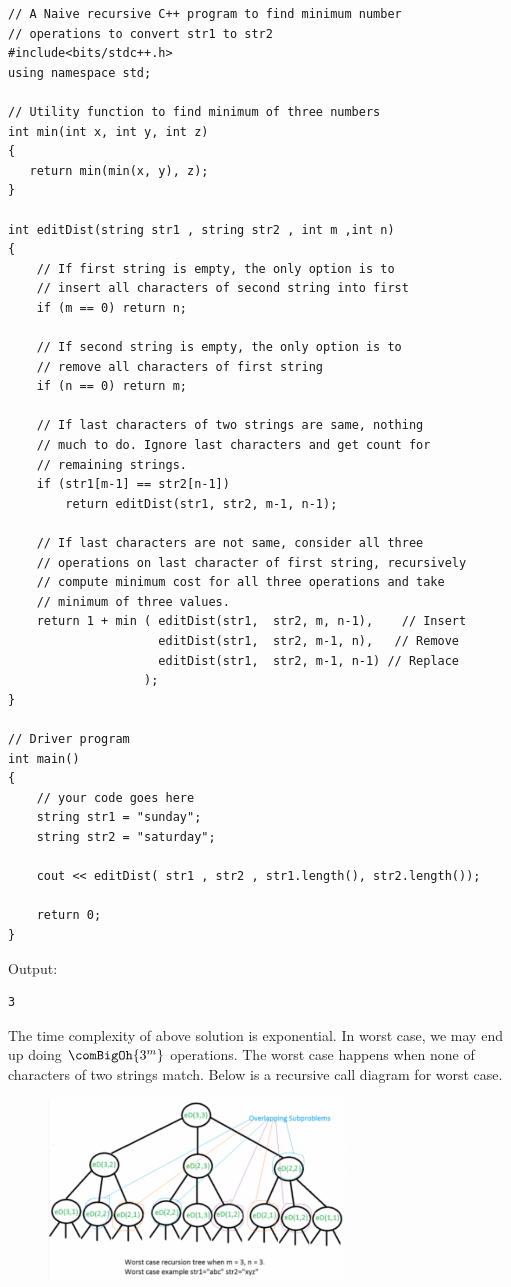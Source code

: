 \begin{lstlisting}[style=raycppnewsnippet]
// A Naive recursive C++ program to find minimum number
// operations to convert str1 to str2
#include<bits/stdc++.h>
using namespace std;
 
// Utility function to find minimum of three numbers
int min(int x, int y, int z)
{
   return min(min(x, y), z);
}
 
int editDist(string str1 , string str2 , int m ,int n)
{
    // If first string is empty, the only option is to
    // insert all characters of second string into first
    if (m == 0) return n;
 
    // If second string is empty, the only option is to
    // remove all characters of first string
    if (n == 0) return m;
 
    // If last characters of two strings are same, nothing
    // much to do. Ignore last characters and get count for
    // remaining strings.
    if (str1[m-1] == str2[n-1])
        return editDist(str1, str2, m-1, n-1);
 
    // If last characters are not same, consider all three
    // operations on last character of first string, recursively
    // compute minimum cost for all three operations and take
    // minimum of three values.
    return 1 + min ( editDist(str1,  str2, m, n-1),    // Insert
                     editDist(str1,  str2, m-1, n),   // Remove
                     editDist(str1,  str2, m-1, n-1) // Replace
                   );
}

// Driver program
int main()
{
    // your code goes here
    string str1 = "sunday";
    string str2 = "saturday";
 
    cout << editDist( str1 , str2 , str1.length(), str2.length());
 
    return 0;
}
\end{lstlisting}
Output:
\begin{lstlisting}[style=rayio]
3
\end{lstlisting}
The time complexity of above solution is exponential. In worst case, we may
end up doing $\comBigOh{3^m}$ operations. The worst case happens when none of
characters of two strings match. Below is a recursive call diagram for worst
case.

\begin{figure}
\centering
\includegraphics[width=0.7\textwidth]{Images/figGFGDPSet5EditDist}
\label{figGFGDPSet5EditDist}
\end{figure}

